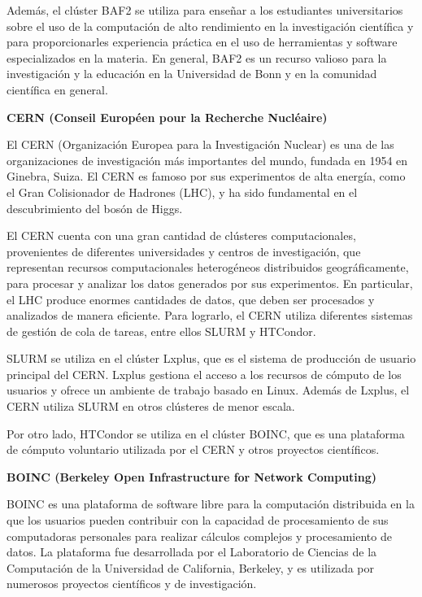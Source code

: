 \begin{spacing}{1.5}
  Además, el clúster BAF2 se utiliza para enseñar a los estudiantes
  universitarios sobre el uso de la computación de alto rendimiento en la
  investigación científica y para proporcionarles experiencia práctica en el uso
  de herramientas y software especializados en la materia. En general, BAF2 es un
  recurso valioso para la investigación y la educación en la Universidad de Bonn
  y en la comunidad científica en general.

  \textbf{CERN (Conseil Européen pour la Recherche Nucléaire)}

  El CERN (Organización Europea para la Investigación Nuclear) es una de las
  organizaciones de investigación más importantes del mundo, fundada en 1954 en
  Ginebra, Suiza. El CERN es famoso por sus experimentos de alta energía, como el
  Gran Colisionador de Hadrones (LHC), y ha sido fundamental en el descubrimiento
  del bosón de Higgs.

  El CERN cuenta con una gran cantidad de clústeres computacionales,
  provenientes de diferentes universidades y centros de investigación, que
  representan recursos computacionales heterogéneos distribuidos geográficamente,
  para procesar y analizar los datos generados por sus experimentos. En
  particular, el LHC produce enormes cantidades de datos, que deben ser
  procesados y analizados de manera eficiente. Para lograrlo, el CERN utiliza
  diferentes sistemas de gestión de cola de tareas, entre ellos SLURM y HTCondor.

  SLURM se utiliza en el clúster Lxplus, que es el sistema de producción de
  usuario principal del CERN. Lxplus gestiona el acceso a los recursos de cómputo
  de los usuarios y ofrece un ambiente de trabajo basado en Linux. Además de
  Lxplus, el CERN utiliza SLURM en otros clústeres de menor escala.

  Por otro lado, HTCondor se utiliza en el clúster BOINC, que es una plataforma
  de cómputo voluntario utilizada por el CERN y otros proyectos científicos.

  \textbf{BOINC (Berkeley Open Infrastructure for Network Computing)}

  BOINC es una plataforma de software libre para la computación distribuida en
  la que los usuarios pueden contribuir con la capacidad de procesamiento de sus
  computadoras personales para realizar cálculos complejos y procesamiento de
  datos. La plataforma fue desarrollada por el Laboratorio de Ciencias de la
  Computación de la Universidad de California, Berkeley, y es utilizada por
  numerosos proyectos científicos y de investigación.


\end{spacing}
